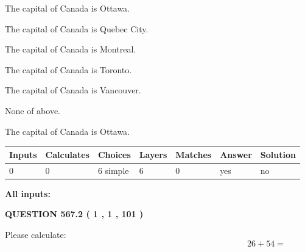 \documentclass[12pt]{article}
\begin{document}
 
The capital of Canada is Ottawa.
 
 
The capital of Canada is Quebec City.
 
 
The capital of Canada is Montreal.
 
 
The capital of Canada is Toronto.
 
 
The capital of Canada is Vancouver.
 
 
 None of above.
 
 
\noindent{}
 
 
The capital of Canada is Ottawa.
 
 
\noindent{}
 
 
   
   
   
   
\noindent\begin{tabular}{|l|l|l|l|l|l|l|}
 \hline
Inputs & Calculates & Choices & Layers & Matches & Answer & Solution \\ \hline
 0  & 
 0  & 
 6
  simple  
  & 
 6  & 
 0  & 
  yes & 
  no 
  \\ \hline
 \end{tabular}
   
   
   
   
\noindent{}
   
   
   
   
\noindent\vspace{0.1in}\hspace{-0.08in} {\textbf{\Large{All inputs: }}}
   
   
  
\vspace{0.2in}
  
{\textbf{\Large{QUESTION
567.2 
 ( 1 , 1 , 101 )
}}}
  
  
 
Please calculate:
\begin{equation}
26 +  %
54 = \nonumber
\end{equation}
 
 
 
\noindent{}
 
\end{document}
